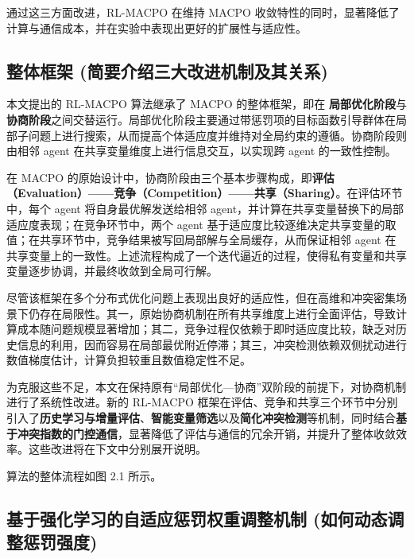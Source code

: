 \documentclass[12pt]{ctexart}
\begin{document}
通过这三方面改进，RL-MACPO 在维持 MACPO
收敛特性的同时，显著降低了计算与通信成本，并在实验中表现出更好的扩展性与适应性。

\subsection{整体框架
(简要介绍三大改进机制及其关系)}\label{ux6574ux4f53ux6846ux67b6-ux7b80ux8981ux4ecbux7ecdux4e09ux5927ux6539ux8fdbux673aux5236ux53caux5176ux5173ux7cfb}

本文提出的 RL-MACPO 算法继承了 MACPO 的整体框架，即在
\textbf{局部优化阶段}与\textbf{协商阶段}之间交替运行。局部优化阶段主要通过带惩罚项的目标函数引导群体在局部子问题上进行搜索，从而提高个体适应度并维持对全局约束的遵循。协商阶段则由相邻
agent 在共享变量维度上进行信息交互，以实现跨 agent 的一致性控制。

在 MACPO
的原始设计中，协商阶段由三个基本步骤构成，即\textbf{评估（Evaluation）------竞争（Competition）------共享（Sharing）}。在评估环节中，每个
agent 将自身最优解发送给相邻
agent，并计算在共享变量替换下的局部适应度表现；在竞争环节中，两个 agent
基于适应度比较逐维决定共享变量的取值；在共享环节中，竞争结果被写回局部解与全局缓存，从而保证相邻
agent
在共享变量上的一致性。上述流程构成了一个迭代逼近的过程，使得私有变量和共享变量逐步协调，并最终收敛到全局可行解。

尽管该框架在多个分布式优化问题上表现出良好的适应性，但在高维和冲突密集场景下仍存在局限性。其一，原始协商机制在所有共享维度上进行全面评估，导致计算成本随问题规模显著增加；其二，竞争过程仅依赖于即时适应度比较，缺乏对历史信息的利用，因而容易在局部最优附近停滞；其三，冲突检测依赖双侧扰动进行数值梯度估计，计算负担较重且数值稳定性不足。

为克服这些不足，本文在保持原有``局部优化---协商''双阶段的前提下，对协商机制进行了系统性改进。新的
RL-MACPO
框架在评估、竞争和共享三个环节中分别引入了\textbf{历史学习与增量评估}、\textbf{智能变量筛选}以及\textbf{简化冲突检测}等机制，同时结合\textbf{基于冲突指数的门控通信}，显著降低了评估与通信的冗余开销，并提升了整体收敛效率。这些改进将在下文中分别展开说明。

算法的整体流程如图 2.1 所示。

\subsection{基于强化学习的自适应惩罚权重调整机制
(如何动态调整惩罚强度)}\label{ux57faux4e8eux5f3aux5316ux5b66ux4e60ux7684ux81eaux9002ux5e94ux60e9ux7f5aux6743ux91cdux8c03ux6574ux673aux5236-ux5982ux4f55ux52a8ux6001ux8c03ux6574ux60e9ux7f5aux5f3aux5ea6}
\end{document}
